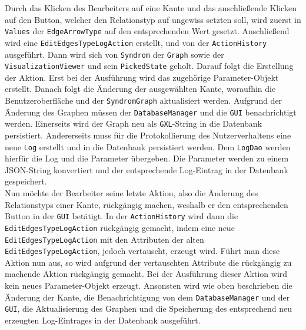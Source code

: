 \documentclass[enabledeprecatedfontcommands,fontsize=11pt,paper=a4,twoside]{scrartcl}
\begin{document}
	Durch das Klicken des Bearbeiters auf eine Kante und das anschließende Klicken auf den Button, welcher den Relationstyp auf ungewiss setzten soll, wird zuerst in \texttt{Values} der \texttt{EdgeArrowType} auf den entsprechenden Wert gesetzt. Anschließend wird eine \texttt{EditEdgesTypeLogAction} erstellt, und von der \texttt{ActionHistory} ausgeführt. Dann wird sich von \texttt{Syndrom} der \texttt{Graph} sowie der \texttt{VisualizationViewer} und sein \texttt{PickedState} geholt. Darauf folgt die Erstellung der Aktion. Erst bei der Ausführung wird das  zugehörige Parameter-Objekt erstellt. Danach folgt die Änderung der ausgewählten Kante, woraufhin die Benutzeroberfläche und der \texttt{SyndromGraph} aktualisiert werden. Aufgrund der Änderung des Graphen müssen der \texttt{DatabaseManager} und die \texttt{GUI} benachrichtigt werden. Einerseits wird der Graph neu als \texttt{GXL}-String in die Datenbank persistiert. Andererseits muss für die Protokollierung des Nutzerverhaltens eine neue \texttt{Log} erstellt und in die Datenbank persistiert werden. Dem \texttt{LogDao} werden hierfür die Log und die Parameter übergeben. Die Parameter werden zu einem JSON-String konvertiert und der entsprechende Log-Eintrag in der Datenbank gespeichert.  \\
	
	Nun möchte der Bearbeiter seine letzte Aktion, also die Änderung des Relationstyps einer Kante, rückgängig machen, weshalb er den entsprechenden Button in der \texttt{GUI} betätigt. In der \texttt{ActionHistory} wird dann die \texttt{EditEdgesTypeLogAction} rückgängig gemacht, indem eine neue \texttt{EditEdgesTypeLogAction} mit den Attributen der alten \texttt{EditEdgesTypeLogAction}, jedoch vertauscht, erzeugt wird. Führt man diese Aktion nun aus, so wird aufgrund der vertauschten Attribute die rückgängig zu machende Aktion rückgängig gemacht. Bei der Ausführung dieser Aktion wird kein neues Parameter-Objekt erzeugt. Ansonsten wird wie oben beschrieben die Änderung der Kante, die Benachrichtigung von dem \texttt{DatabaseManager} und der \texttt{GUI}, die Aktualisierung des Graphen und die Speicherung des entsprechend neu erzeugten Log-Eintrages in der Datenbank ausgeführt. 
	
	
	
	
	
\end{document}
